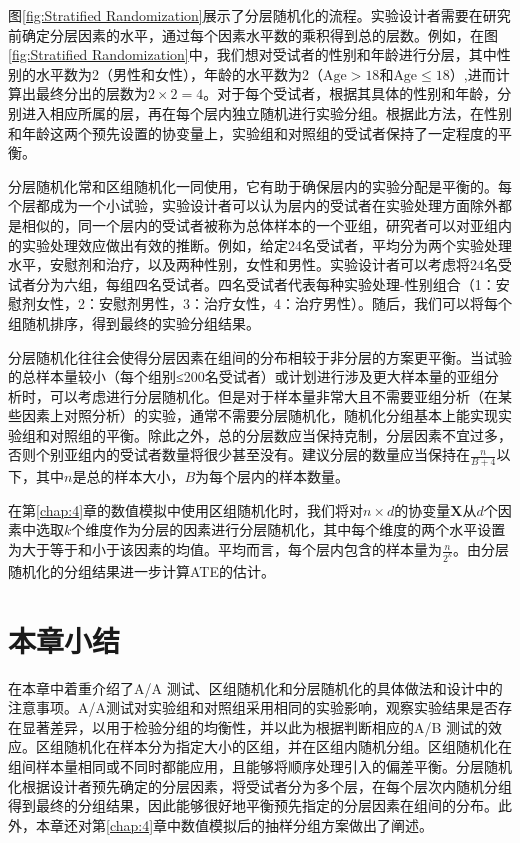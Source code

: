图\ref{fig:Stratified Randomization}展示了分层随机化的流程。实验设计者需要在研究前确定分层因素的水平，通过每个因素水平数的乘积得到总的层数。例如，在图\ref{fig:Stratified Randomization}中，我们想对受试者的性别和年龄进行分层，其中性别的水平数为2（男性和女性），年龄的水平数为2（$\text{Age}>18$和$\text{Age} \leq 18$）,进而计算出最终分出的层数为$2 \times 2=4$。对于每个受试者，根据其具体的性别和年龄，分别进入相应所属的层，再在每个层内独立随机进行实验分组。根据此方法，在性别和年龄这两个预先设置的协变量上，实验组和对照组的受试者保持了一定程度的平衡。

分层随机化常和区组随机化一同使用，它有助于确保层内的实验分配是平衡的。每个层都成为一个小试验，实验设计者可以认为层内的受试者在实验处理方面除外都是相似的，同一个层内的受试者被称为总体样本的一个亚组，研究者可以对亚组内的实验处理效应做出有效的推断\cite{kernan1999stratified}。例如，给定24名受试者，平均分为两个实验处理水平，安慰剂和治疗，以及两种性别，女性和男性。实验设计者可以考虑将24名受试者分为六组，每组四名受试者。四名受试者代表每种实验处理-性别组合（1：安慰剂女性，2：安慰剂男性，3：治疗女性，4：治疗男性）。随后，我们可以将每个组随机排序，得到最终的实验分组结果\cite{burger2020importance}。

分层随机化往往会使得分层因素在组间的分布相较于非分层的方案更平衡。当试验的总样本量较小（每个组别≤200名受试者）或计划进行涉及更大样本量的亚组分析时，可以考虑进行分层随机化。但是对于样本量非常大且不需要亚组分析（在某些因素上对照分析）的实验，通常不需要分层随机化，随机化分组基本上能实现实验组和对照组的平衡。除此之外，总的分层数应当保持克制，分层因素不宜过多，否则个别亚组内的受试者数量将很少甚至没有。建议分层的数量应当保持在$\frac{n}{B+4}$以下，其中$n$是总的样本大小，$B$为每个层内的样本数量\cite{kernan1999stratified}。

在第\ref{chap:4}章的数值模拟中使用区组随机化时，我们将对$n\times d$的协变量$\mathbf{X}$从$d$个因素中选取$k$个维度作为分层的因素进行分层随机化，其中每个维度的两个水平设置为大于等于和小于该因素的均值。平均而言，每个层内包含的样本量为$\frac{n}{2^k}$。由分层随机化的分组结果进一步计算ATE的估计。

\section{本章小结}
在本章中着重介绍了A/A 测试、区组随机化和分层随机化的具体做法和设计中的注意事项。A/A测试对实验组和对照组采用相同的实验影响，观察实验结果是否存在显著差异，以用于检验分组的均衡性，并以此为根据判断相应的A/B 测试的效应。区组随机化在样本分为指定大小的区组，并在区组内随机分组。区组随机化在组间样本量相同或不同时都能应用，且能够将顺序处理引入的偏差平衡。分层随机化根据设计者预先确定的分层因素，将受试者分为多个层，在每个层次内随机分组得到最终的分组结果，因此能够很好地平衡预先指定的分层因素在组间的分布。此外，本章还对第\ref{chap:4}章中数值模拟后的抽样分组方案做出了阐述。

